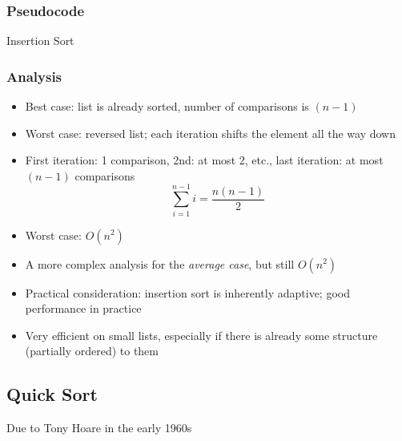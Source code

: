 \subsubsection{Pseudocode}

    \begin{algorithm}[H]
    \caption{Insertion Sort}
    \label{algo:insertionSort}
    \end{algorithm}

\subsubsection{Analysis}

\begin{itemize}
  \item Best case: list is already sorted, number of comparisons is $(n-1)$
  \item Worst case: reversed list; each iteration shifts the element all the way down
  \item First iteration: 1 comparison, 2nd: at most 2, etc., last iteration: at most $(n-1)$ comparisons
	$$\sum_{i=1}^{n-1} i = \frac{n(n-1)}{2}$$
  \item Worst case: $O(n^2)$
  \item A more complex analysis for the \emph{average case}, but still $O(n^2)$
  \item Practical consideration: insertion sort is inherently adaptive; good performance in practice
  \item Very efficient on small lists, especially if there is already some structure (partially ordered) to them
\end{itemize}


\subsection{Quick Sort}

Due to Tony Hoare in the early 1960s \cite{Hoare:1961:AQ:366622.366644,Quicksort}


